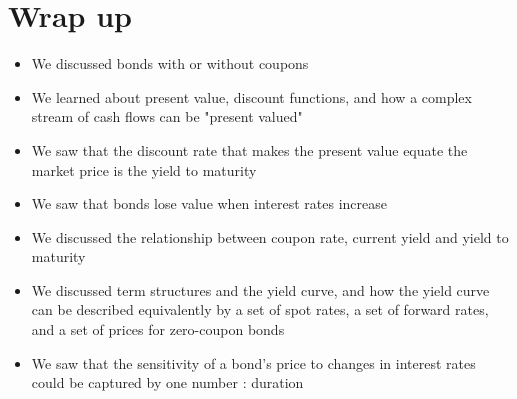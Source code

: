 \documentclass[letterpaper]{article}
\begin{document}
\section*{Wrap up}
\begin{itemize}
  \item We discussed bonds with or without coupons
  \item We learned about present value, discount functions, and how a complex stream of cash flows can be "present valued"
  \item We saw that the discount rate that makes the present value equate the market price is the yield to maturity
  \item We saw that bonds lose value when interest rates increase
  \item We discussed the relationship between coupon rate, current yield and yield to maturity
  \item We discussed term structures and the yield curve, and how the yield curve can be described equivalently by a set of spot rates, a set of forward rates, and a set of prices for zero-coupon bonds
  \item We saw that the sensitivity of a bond's price to changes in interest rates could be captured by one number : duration
\end{itemize}
\end{document}
